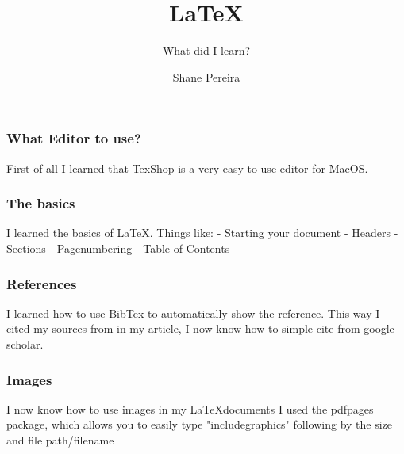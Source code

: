 \documentclass{beamer}
\author{Shane Pereira}
\title{\LaTeX}
\subtitle{What did I learn?}
\begin{document}
\frame{\titlepage}
\thispagestyle{empty}



\begin{frame}

\frametitle{What Editor to use?}
First of all I learned that TexShop is a very easy-to-use editor for MacOS.
\end{frame}

\begin{frame}
\frametitle{The basics}
I learned the basics of LaTeX.
Things like:
	- Starting your document
	- Headers
	- Sections
	- Pagenumbering
	- Table of Contents
\end{frame}

\begin{frame}
\frametitle{References}
I learned how to use BibTex to automatically show the reference.
This way I cited my sources from in my article, I now know how to simple cite from google scholar.
\end{frame}

\begin{frame}
\frametitle{Images}
I now know how to use images in my \LaTeX documents
I used the pdfpages package, which allows you to easily type "includegraphics" following by the size and file path/filename
\end{frame}
\end{document}
